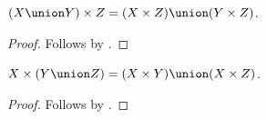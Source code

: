 \begin{proposition}\label{union_times_left}
    $(X\union Y)\times Z = (X\times Z)\union (Y\times Z)$.
\end{proposition}
\begin{proof}
    Follows by .
\end{proof}

\begin{proposition}\label{union_times_right}
    $X\times (Y\union Z) = (X\times Y)\union (X\times Z)$.
\end{proposition}
\begin{proof}
    Follows by .
\end{proof}

